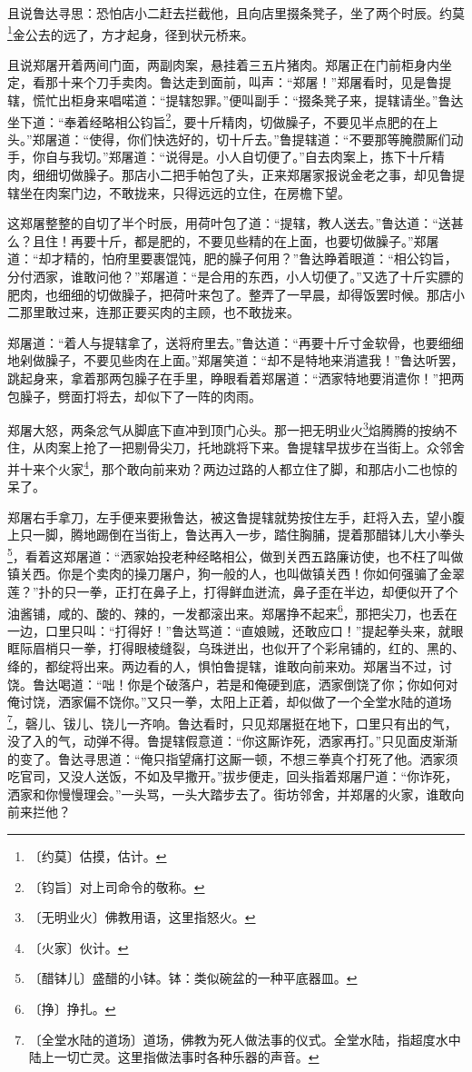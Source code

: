 \documentclass[12pt,UTF-8,openany]{ctexbook}
\begin{document}
\begin{large}
    且说鲁达寻思：恐怕店小二赶去拦截他，且向店里掇条凳子，坐了两个时辰。约莫\footnote{〔约莫〕估摸，估计。}金公去的远了，方才起身，径到状元桥来。
    
    且说郑屠开着两间门面，两副肉案，悬挂着三五片猪肉。郑屠正在门前柜身内坐定，看那十来个刀手卖肉。鲁达走到面前，叫声：“郑屠！”郑屠看时，见是鲁提辖，慌忙出柜身来唱喏道：“提辖恕罪。”便叫副手：“掇条凳子来，提辖请坐。”鲁达坐下道：“奉着经略相公钧旨\footnote{〔钧旨〕对上司命令的敬称。}，要十斤精肉，切做臊子，不要见半点肥的在上头。”郑屠道：“使得，你们快选好的，切十斤去。”鲁提辖道：“不要那等腌臜厮们动手，你自与我切。”郑屠道：“说得是。小人自切便了。”自去肉案上，拣下十斤精肉，细细切做臊子。那店小二把手帕包了头，正来郑屠家报说金老之事，却见鲁提辖坐在肉案门边，不敢拢来，只得远远的立住，在房檐下望。
    
    这郑屠整整的自切了半个时辰，用荷叶包了道：“提辖，教人送去。”鲁达道：“送甚么？且住！再要十斤，都是肥的，不要见些精的在上面，也要切做臊子。”郑屠道：“却才精的，怕府里要裹馄饨，肥的臊子何用？”鲁达睁着眼道：“相公钧旨，分付洒家，谁敢问他？”郑屠道：“是合用的东西，小人切便了。”又选了十斤实膘的肥肉，也细细的切做臊子，把荷叶来包了。整弄了一早晨，却得饭罢时候。那店小二那里敢过来，连那正要买肉的主顾，也不敢拢来。
    
    郑屠道：“着人与提辖拿了，送将府里去。”鲁达道：“再要十斤寸金软骨，也要细细地剁做臊子，不要见些肉在上面。”郑屠笑道：“却不是特地来消遣我！”鲁达听罢，跳起身来，拿着那两包臊子在手里，睁眼看着郑屠道：“洒家特地要消遣你！”把两包臊子，劈面打将去，却似下了一阵的肉雨。
    
    郑屠大怒，两条忿气从脚底下直冲到顶门心头。那一把无明业火\footnote{〔无明业火〕佛教用语，这里指怒火。}焰腾腾的按纳不住，从肉案上抢了一把剔骨尖刀，托地跳将下来。鲁提辖早拔步在当街上。众邻舍并十来个火家\footnote{〔火家〕伙计。}，那个敢向前来劝？两边过路的人都立住了脚，和那店小二也惊的呆了。
    
    郑屠右手拿刀，左手便来要揪鲁达，被这鲁提辖就势按住左手，赶将入去，望小腹上只一脚，腾地踢倒在当街上，鲁达再入一步，踏住胸脯，提着那醋钵儿大小拳头\footnote{〔醋钵儿〕盛醋的小钵。钵：类似碗盆的一种平底器皿。}，看着这郑屠道：“洒家始投老种经略相公，做到关西五路廉访使，也不枉了叫做镇关西。你是个卖肉的操刀屠户，狗一般的人，也叫做镇关西！你如何强骗了金翠莲？”扑的只一拳，正打在鼻子上，打得鲜血迸流，鼻子歪在半边，却便似开了个油酱铺，咸的、酸的、辣的，一发都滚出来。郑屠挣不起来\footnote{〔挣〕挣扎。}，那把尖刀，也丢在一边，口里只叫：“打得好！”鲁达骂道：“直娘贼，还敢应口！”提起拳头来，就眼眶际眉梢只一拳，打得眼棱缝裂，乌珠迸出，也似开了个彩帛铺的，红的、黑的、绛的，都绽将出来。两边看的人，惧怕鲁提辖，谁敢向前来劝。郑屠当不过，讨饶。鲁达喝道：“咄！你是个破落户，若是和俺硬到底，洒家倒饶了你；你如何对俺讨饶，洒家偏不饶你。”又只一拳，太阳上正着，却似做了一个全堂水陆的道场\footnote{〔全堂水陆的道场〕道场，佛教为死人做法事的仪式。全堂水陆，指超度水中陆上一切亡灵。这里指做法事时各种乐器的声音。}，磬儿、钹儿、铙儿一齐响。鲁达看时，只见郑屠挺在地下，口里只有出的气，没了入的气，动弹不得。鲁提辖假意道：“你这厮诈死，洒家再打。”只见面皮渐渐的变了。鲁达寻思道：“俺只指望痛打这厮一顿，不想三拳真个打死了他。洒家须吃官司，又没人送饭，不如及早撒开。”拔步便走，回头指着郑屠尸道：“你诈死，洒家和你慢慢理会。”一头骂，一头大踏步去了。街坊邻舍，并郑屠的火家，谁敢向前来拦他？
    

\end{large}
\end{document}
